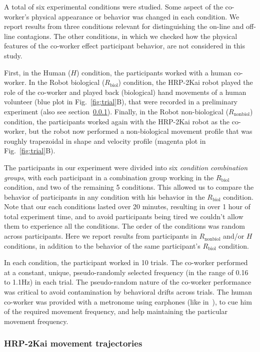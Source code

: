 \documentclass[a4paper, 12pt, oneside]{Thesis}  %
\begin{document}
A total of six experimental conditions were studied. Some aspect of the co-worker's physical appearance or behavior was changed in each condition. We report results from three conditions relevant for distinguishing the on-line and off-line contagions. The other conditions, in which we checked how the physical features of the co-worker effect participant behavior, are not considered in this study.

First, in the Human ($H$) condition, the participants worked with a human co-worker. In the Robot biological ($R_{\text{biol}}$) condition, the HRP-2Kai robot played the role of the co-worker and played back (biological) hand movements of a human volunteer (blue plot in Fig.~\ref{fig:trial}B), that were recorded in a preliminary experiment (also see section~\ref{hrpTraj}). Finally, in the Robot non-biological ($R_{\text{nonbiol}}$) condition, the participants worked again with the HRP-2Kai robot as the co-worker, but the robot now performed a non-biological movement profile that was roughly trapezoidal in shape and velocity profile (magenta plot in Fig.~\ref{fig:trial}B). 

The participants in our experiment were divided into six \emph{condition combination groups}, with each participant in a combination group working in the  $R_{\text{biol}}$ condition, and two of the remaining 5 conditions. This allowed us to compare the behavior of participants in any condition with his behavior in the $R_{\text{biol}}$ condition. Note that our each conditions lasted over 20 minutes, resulting in over 1 hour of total experiment time, and to avoid participants being tired we couldn't allow them to experience all the conditions. The order of the conditions was random across participants. Here we report results from participants in $R_{\text{nonbiol}}$ and/or $H$ conditions, in addition to the behavior of the same participant's $R_{\text{biol}}$ condition.

In each condition, the participant worked in 10 trials. The co-worker performed at a constant, unique, pseudo-randomly selected frequency (in the range of 0.16 to 1.1Hz) in each trial. The pseudo-random nature of the co-worker performance was critical to avoid contamination by behavioral drifts across trials. The human co-worker was provided with a metronome using earphones (like in~\cite{Bisio:PlosOne:2014}), to cue him of the required movement frequency, and help maintaining the particular movement frequency.

\subsubsection{HRP-2Kai movement trajectories} \label{hrpTraj}
\end{document}
